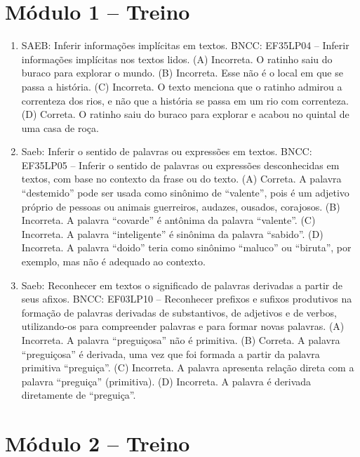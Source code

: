 \pagebreak
\pagestyle{plain}
\footnotesize

\pagecolor{gray!40}

\section*{Módulo 1 – Treino}

\begin{enumerate}
\item
SAEB: Inferir informações implícitas em textos. BNCC: EF35LP04 -- Inferir informações implícitas nos textos lidos. (A) Incorreta. O ratinho saiu do buraco para explorar o mundo. (B) Incorreta. Esse não é o local em que se passa a história. (C) Incorreta. O texto menciona que o ratinho admirou a correnteza dos rios, e não que a história se passa em um rio com correnteza. (D) Correta. O ratinho saiu do buraco para explorar e acabou no quintal de uma casa de roça.

\item
Saeb: Inferir o sentido de palavras ou expressões em textos.
BNCC: EF35LP05 -- Inferir o sentido de palavras ou expressões
desconhecidas em textos, com base no contexto da frase ou do texto.
(A) Correta. A palavra ``destemido'' pode ser usada como sinônimo de
``valente'', pois é um adjetivo próprio de pessoas ou animais
guerreiros, audazes, ousados, corajosos.
(B) Incorreta. A palavra ``covarde'' é antônima da palavra ``valente''.
(C) Incorreta. A palavra ``inteligente'' é sinônima da palavra
``sabido''.
(D) Incorreta. A palavra ``doido'' teria como sinônimo ``maluco'' ou
``biruta'', por exemplo, mas não é adequado ao contexto.

\item
Saeb: Reconhecer em textos o significado de palavras derivadas a partir de seus afixos.
BNCC: EF03LP10 -- Reconhecer prefixos e sufixos produtivos na formação de
palavras derivadas de substantivos, de adjetivos e de verbos,
utilizando-os para compreender palavras e para formar novas palavras.
(A) Incorreta. A palavra ``preguiçosa'' não é primitiva.
(B) Correta. A palavra ``preguiçosa'' é derivada, uma vez que foi
formada a partir da palavra primitiva ``preguiça''.
(C) Incorreta. A palavra apresenta relação direta com a palavra
``preguiça'' (primitiva).
(D) Incorreta. A palavra é derivada diretamente de ``preguiça''.
\end{enumerate}

\section*{Módulo 2 – Treino}

